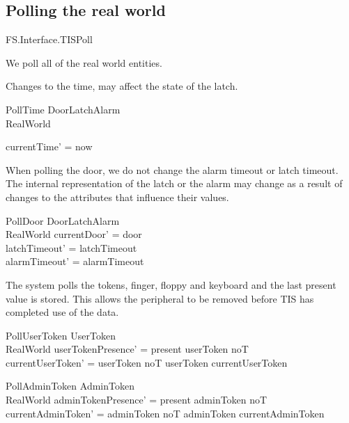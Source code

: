 \subsection{Polling the real world}

\begin{traceunit}{FS.Interface.TISPoll}
\end{traceunit}

We poll all of the real world entities.

Changes to the time, may affect the state of the latch. 

\begin{schema}{PollTime}
	\Delta DoorLatchAlarm
\\       RealWorld

\where
	currentTime' = now
\end{schema}


When polling the door, we do not change the alarm timeout or latch
timeout. The internal representation of the latch or the alarm may
change as a result of changes to the attributes that influence their
values. 

\begin{schema}{PollDoor}
	\Delta DoorLatchAlarm
\\	RealWorld
\where
	currentDoor' = door
\\	latchTimeout' = latchTimeout
\\	alarmTimeout' = alarmTimeout
\end{schema}

The system polls the tokens, finger, floppy and keyboard and the last
present value is stored. This allows the 
peripheral to be removed before TIS has completed use of the data.

\begin{schema}{PollUserToken}
        \Delta UserToken
\\	RealWorld
\where
	userTokenPresence' = present \iff userToken \neq noT
\\	currentUserToken' =  \IF userToken \neq noT \THEN userToken \ELSE currentUserToken
\end{schema}

\begin{schema}{PollAdminToken}
	\Delta AdminToken
\\      RealWorld
\where
	adminTokenPresence' = present \iff adminToken \neq noT
\\	currentAdminToken' = \IF adminToken \neq noT \THEN
adminToken \ELSE currentAdminToken
\end{schema}

